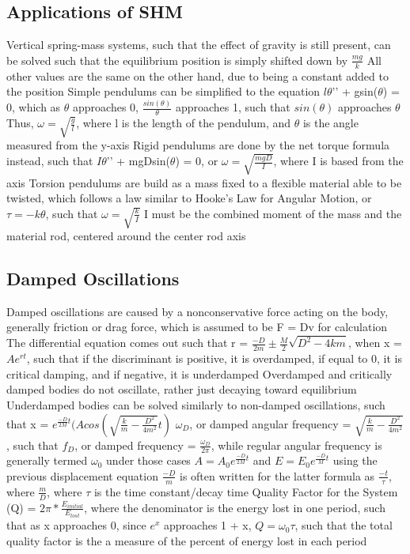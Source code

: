 \documentclass[11 pt, twoside]{article}
\newenvironment{outline*}
{
	\begin{outline}[enumerate]
	}
	{\end{outline}
}
\begin{document}
\subsection{Applications of SHM}
\begin{outline*}
\1 Vertical spring-mass systems, such that the effect of gravity is still present, can be solved such that the equilibrium position is simply shifted down by $\frac{mg}{k}$
\2 All other values are the same on the other hand, due to being a constant added to the position
\1 Simple pendulums can be simplified to the equation $l\theta$’’ + gsin($\theta$) = 0, which as $\theta$ approaches 0, $\frac{sin(\theta)}{\theta}$ approaches 1, such that $sin(\theta)$ approaches $\theta$
\2 Thus, $\omega = \sqrt{\frac{g}{l}}$, where l is the length of the pendulum, and $\theta$ is the angle measured from the y-axis
\1 Rigid pendulums are done by the net torque formula instead, such that $I\theta$’’ + mgDsin($\theta$) = 0, or $\omega = \sqrt{\frac{mgD}{I}}$, where I is based from the axis
\1 Torsion pendulums are build as a mass fixed to a flexible material able to be twisted, which follows a law similar to Hooke’s Law for Angular Motion, or $\tau = -k\theta$, such that $\omega = \sqrt{\frac{k}{I}}$
\2 I must be the combined moment of the mass and the material rod, centered around the center rod axis
\end{outline*}
\subsection{Damped Oscillations}
\begin{outline*}
\1 Damped oscillations are caused by a nonconservative force acting on the body, generally friction or drag force, which is assumed to be F = Dv for calculation
\1 The differential equation comes out such that r = $\frac{-D}{2m} \pm \frac{M}{2}\sqrt{D^2 - 4km}$, when x = $Ae^{rt}$, such that if the discriminant is positive, it is overdamped, if equal to 0, it is critical damping, and if negative, it is underdamped
\2 Overdamped and critically damped bodies do not oscillate, rather just decaying toward equilibrium
\2 Underdamped bodies can be solved similarly to non-damped oscillations, such that x = $e^{\frac{-D}{2M}t}(Acos(\sqrt{\frac{k}{m} - \frac{D^2}{4m^2}}t)$
\1 $\omega_D$, or damped angular frequency = $\sqrt{\frac{k}{m} - \frac{D^2}{4m^2}}$, such that $f_D$, or damped frequency = $\frac{\omega_D}{2\pi}$, while regular angular frequency is generally termed $\omega_0$ under those cases
\1 $A = A_0e^{\frac{-D}{2M}t}$ and $E = E_0e^{\frac{-D}{M}t}$ using the previous displacement equation
\2 $\frac{-D}{m}$ is often written for the latter formula as $\frac{-t}{\tau}$, where $\frac{m}{D}$, where $\tau$ is the time constant/decay time
\2 Quality Factor for the System (Q) = $2\pi * \frac{E_{initial}}{E_{lost}}$, where the denominator is the energy lost in one period, such that as x approaches 0, since $e^x$ approaches 1 + x, $Q = \omega_0 \tau$, such that the total quality factor is the a measure of the percent of energy lost in each period
\end{outline*}
\end{document}
